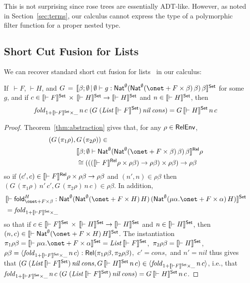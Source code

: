 \documentclass[runningheads]{llncs}
\newcommand{\fold}{\mathsf{fold}}
\begin{document}
\noindent
This is not surprising since rose trees are essentially
ADT-like. However, as noted in Section~\ref{sec:terms}, our calculus
cannot express the type of a polymorphic filter function for a proper
nested type.

\subsection{Short Cut Fusion for Lists}\label{sec:short-cut}

We can recover standard short cut fusion for lists~\cite{glp93} in our
calculus: 
\begin{theorem}
If \,$\vdash F$, $\vdash H$, and 
$G \, = \, \setsem{\beta; \emptyset \,|\, \emptyset \vdash g :
  \Nat^{\emptyset} (\Nat^{\emptyset} (\onet + F \times \beta)\,
  \beta)\, \beta}$ for some $g$, and if $c \in \llbracket{\vdash F}\rrbracket^{\mathsf{Set}}
\,\times\, \llbracket{\vdash H}\rrbracket^{\mathsf{Set}} \to \llbracket{\vdash H}\rrbracket^{\mathsf{Set}}$ and $n \in
\llbracket{\vdash H}\rrbracket^{\mathsf{Set}}$, then
\[\mathit{fold}_{1 + \llbracket{\vdash F}\rrbracket^{\mathsf{Set}} \times \_}\, n\, c\; (G\; (\mathit{List}\,
\llbracket{\vdash F}\rrbracket^{\mathsf{Set}})\,\mathit{nil} \,\mathit{cons}) = G \,\llbracket{\vdash
  H}\rrbracket^{\mathsf{Set}}\, n\, c \]
\end{theorem}
\begin{proof}
Theorem~\ref{thm:abstraction} gives
that, for any $\rho \in \mathsf{RelEnv}$,
  \begin{align*}
    (G \,(\pi_1 \rho),  \,
    &G\, (\pi_2 \rho))
 \in  \\ 
    &
    \relsem{\beta; \emptyset \vdash \Nat^{\emptyset} (\Nat^{\emptyset}
  (\onet + F \times \beta)\, \beta)\, \beta} \rho \\
    &
    \cong (((\relsem{\vdash F} \rho \times
\rho\beta) \to \rho\beta) \times \rho\beta) \to \rho\beta
  \end{align*} 
so if $(c', c) \in \llbracket{\vdash F}\rrbracket^{\mathsf{Rel}} \rho \times
\rho\beta \to \rho\beta$ and $(n', n) \in \rho\beta$ then
$(G \,(\pi_1 \rho)\, n'\, c', G\, (\pi_2 \rho)\, n\, c)
\in \rho \beta$.
In addition,
\begin{align*}
  &\setsem{\vdash \fold_{\onet + F
    \times \beta}^{H} : \Nat^{\emptyset} (\Nat^{\emptyset} (\onet
  + F \times H)\, H)\, (\Nat^{\emptyset} (\mu \alpha. \onet
  + F \times \alpha)\, H)} \\ &=
\mathit{fold}_{1 + \setsem{\vdash F} \times \_}
\end{align*}
so that if $c \in
\llbracket{\vdash F}\rrbracket^{\mathsf{Set}} \,\times\, \llbracket{\vdash H}\rrbracket^{\mathsf{Set}} \to
\llbracket{\vdash H}\rrbracket^{\mathsf{Set}}$ and $n \in \llbracket{\vdash H}\rrbracket^{\mathsf{Set}}$,
 then
$(n, c) \in \setsem{\vdash \Nat^{\emptyset} (\onet + F \times H)\,
  H}$. The instantiation
$\pi_1 \rho \beta = \setsem{\vdash \mu \alpha. \onet + F \times
  \alpha}=\mathit{List}\,\setsem{\vdash F}$,\, 
$\pi_2 \rho \beta = \llbracket{\vdash H}\rrbracket^{\mathsf{Set}}$,\,
$\rho \beta = \langle {\mathit{fold}_{1 + \llbracket{\vdash F}\rrbracket^{\mathsf{Set}}\times \_}\, n\, c} \rangle :
\mathsf{Rel}(\pi_1 \rho \beta, \pi_2 \rho \beta)$,\,
$c' = \mathit{cons}$,\, and 
$n' = \mathit{nil}$
thus gives that $(G \;(\mathit{List}\,\llbracket{\vdash
  F}\rrbracket^{\mathsf{Set}})\,\mathit{nil} \,\mathit{cons}, G \,\llbracket{\vdash H}\rrbracket^{\mathsf{Set}} \,
n\, c) \in \langle {\mathit{fold}_{1 + \llbracket{\vdash F}\rrbracket^{\mathsf{Set}}\times \_}\, n\, c} \rangle$, i.e.,
that $\mathit{fold}_{1 + \llbracket{\vdash F}\rrbracket^{\mathsf{Set}} \times \_}\, n\, c\; (G\;
(\mathit{List}\,\llbracket{\vdash F}\rrbracket^{\mathsf{Set}})\, \mathit{nil}\, \mathit{cons})
= G \,\llbracket{\vdash H}\rrbracket^{\mathsf{Set}}\, n\, c$.
\end{proof}
\end{document}
